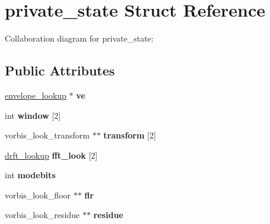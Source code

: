 \hypertarget{structprivate__state}{\section{private\+\_\+state Struct Reference}
\label{structprivate__state}
}


Collaboration diagram for private\+\_\+state\+:
\subsection*{Public Attributes}
\begin{DoxyCompactItemize}
\item 
\hypertarget{structprivate__state_ad7979389aacc2e53e24e8d96325809ac}{\hyperlink{structenvelope__lookup}{envelope\+\_\+lookup} $\ast$ {\bfseries ve}}\label{structprivate__state_ad7979389aacc2e53e24e8d96325809ac}

\item 
\hypertarget{structprivate__state_af9be5f1a2c234d8fed9119b44b691876}{int {\bfseries window} \mbox{[}2\mbox{]}}\label{structprivate__state_af9be5f1a2c234d8fed9119b44b691876}

\item 
\hypertarget{structprivate__state_a1fefdab944d5992d2c837df7420ae0c3}{vorbis\+\_\+look\+\_\+transform $\ast$$\ast$ {\bfseries transform} \mbox{[}2\mbox{]}}\label{structprivate__state_a1fefdab944d5992d2c837df7420ae0c3}

\item 
\hypertarget{structprivate__state_a81d78d1c72db43db2ddbc245444e4cfe}{\hyperlink{structdrft__lookup}{drft\+\_\+lookup} {\bfseries fft\+\_\+look} \mbox{[}2\mbox{]}}\label{structprivate__state_a81d78d1c72db43db2ddbc245444e4cfe}

\item 
\hypertarget{structprivate__state_a3178cdb14e6be6dc5673637d187f8a7b}{int {\bfseries modebits}}\label{structprivate__state_a3178cdb14e6be6dc5673637d187f8a7b}

\item 
\hypertarget{structprivate__state_a760c8e735e944bff53e1cddba407b128}{vorbis\+\_\+look\+\_\+floor $\ast$$\ast$ {\bfseries flr}}\label{structprivate__state_a760c8e735e944bff53e1cddba407b128}

\item 
\hypertarget{structprivate__state_a4a336f98a934f3810f0cba19a597bb45}{vorbis\+\_\+look\+\_\+residue $\ast$$\ast$ {\bfseries residue}}\label{structprivate__state_a4a336f98a934f3810f0cba19a597bb45}


\end{DoxyCompactItemize}
